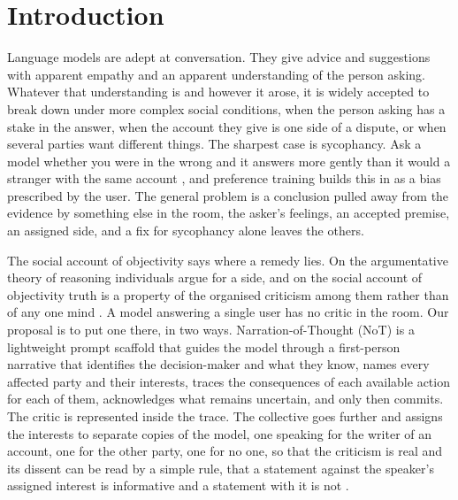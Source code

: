 \section{Introduction}
\label{sec-intro}

Language models are adept at conversation. They give advice and suggestions
with apparent empathy and an apparent understanding of the person asking.
Whatever that understanding is and however it arose, it is widely accepted
to break down under more complex social conditions, when the person asking
has a stake in the answer, when the account they give is one side of a
dispute, or when several parties want different things. The sharpest case
is sycophancy. Ask a model whether you were in the wrong and it answers more
gently than it would a stranger with the same account
\citep{sharma23,cheng25elephant}, and preference training builds this in as
a bias prescribed by the user. The general problem is a conclusion pulled
away from the evidence by something else in the room, the asker's feelings,
an accepted premise, an assigned side, and a fix for sycophancy alone leaves
the others.

The social account of objectivity says where a remedy lies. On the
argumentative theory of reasoning individuals argue for a side, and on the
social account of objectivity truth is a property of the organised
criticism among them rather than of any one mind
\citep{mercier2011argumentative,longino1990science}. A model answering a
single user has no critic in the room. Our proposal is to put one there, in
two ways. Narration-of-Thought (NoT) is a lightweight prompt scaffold that
guides the model through a first-person narrative that identifies the
decision-maker and what they know, names every affected party and their
interests, traces the consequences of each available action for each of
them, acknowledges what remains uncertain, and only then commits. The
critic is represented inside the trace. The collective goes further and
assigns the interests to separate copies of the model, one speaking for
the writer of an account, one for the other party, one for no one, so that
the criticism is real and its dissent can be read by a simple rule, that a
statement against the speaker's assigned interest is informative and a
statement with it is not \citep{milgrom1986relying,lipman1995robust}.

